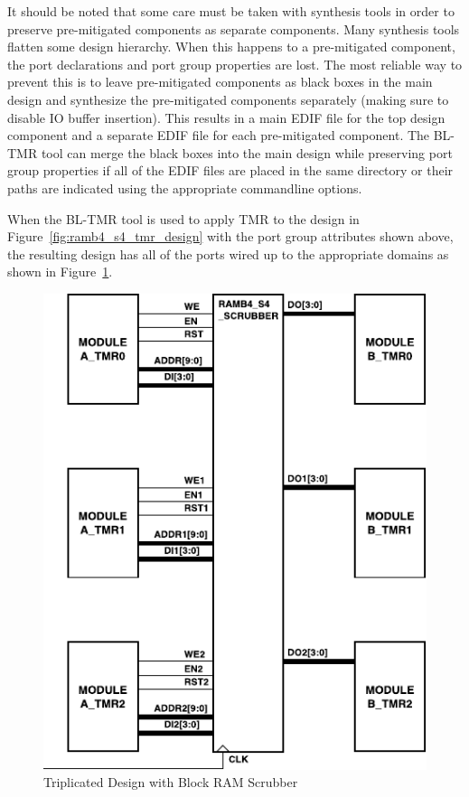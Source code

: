 It should be noted that some care must be taken with synthesis tools in order
to preserve pre-mitigated components as separate components. Many synthesis
tools flatten some design hierarchy. When this happens to a pre-mitigated
component, the port declarations and port group properties are lost. The most
reliable way to prevent this is to leave pre-mitigated components as black
boxes in the main design and synthesize the pre-mitigated components separately
(making sure to disable IO buffer insertion). This results in a main EDIF
file for the top design component and a separate EDIF file for each
pre-mitigated component. The BL-TMR tool can merge the black boxes into the main
design while preserving port group properties if all of the EDIF files are
placed in the same directory or their paths are indicated using the appropriate
commandline options.

When the BL-TMR tool is used to apply TMR to the design in
Figure~\ref{fig:ramb4_s4_tmr_design} with the port group attributes shown above,
the resulting design has all of the ports wired up to the appropriate domains
as shown in Figure~\ref{fig:ramb4_s4_tmr_result}.

\begin{figure}[htb]
\begin{center}
\includegraphics[scale=1]{ramb4_s4_tmr_result.pdf}
\caption{Triplicated Design with Block RAM Scrubber}
\label{fig:ramb4_s4_tmr_result}
\end{center}
\end{figure}

